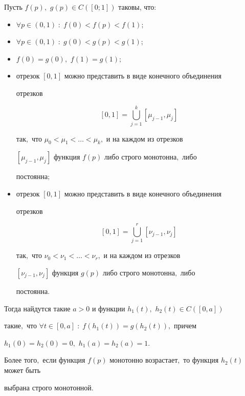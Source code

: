 \begin{lemma} 

Пусть $f(p),$ $g(p)\in C([0;1])$ таковы, что{\/\rm:}

\begin{itemize}

\item[\rm 1)] $\forall p\in(0,1)\;:\;f(0)<f(p)<f(1);$

\item[\rm 2)] $\forall p\in(0,1)\;:\;g(0)<g(p)<g(1);$

\item[\rm 3)] $f(0)=g(0),$ $f(1)=g(1);$

\item[\rm 4)] \hypertarget{myp:4}{}  отрезок $[0,1]$ можно представить в виде конечного объединения

отрезков 

$$

[0,1]=\bigcup\limits_{j=1}^k[\mu_{j-1},\mu_j]

$$

так$,$ что $\mu_0<\mu_1<\dots<\mu_k,$ и на каждом из отрезков

$[\mu_{j-1},\mu_j]$ функция $f(p)$ либо строго монотонна$,$ либо

постоянна$;$

\item[\rm 5)] \hypertarget{myp:5}{}  отрезок $[0,1]$ можно представить в виде конечного объединения

отрезков

$$

[0,1]=\bigcup\limits_{j=1}^r[\nu_{j-1},\nu_j]

$$

так$,$ что $\nu_0<\nu_1<\dots<\nu_r,$ и на каждом из отрезков

$[\nu_{j-1},\nu_j]$ функция $g(p)$ либо строго монотонна$,$ либо

постоянна\rm.



\end{itemize}



\smallskip



Тогда найдутся такие $a>0$ и функции $h_1(t),$ $h_2(t)\in C([0,a])$

такие$,$ что $\forall t\in[0,a]\;:\;f(h_1(t))=g(h_2(t)),$ причем

$h_1(0)=h_2(0)=0,$ $h_1(a)=h_2(a)=1.$ 

Более того$,$ если функция $f(p)$ монотонно возрастает$,$ то функция $h_2(t)$ может быть

выбрана строго монотонной\rm.

\end{lemma}



